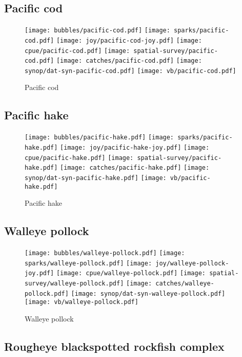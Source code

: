 \subsection*{Pacific cod}

\begin{figure}[htbp]
\centering
\texttt{[image: bubbles/pacific-cod.pdf]}
\texttt{[image: sparks/pacific-cod.pdf]}
\texttt{[image: joy/pacific-cod-joy.pdf]}
\texttt{[image: cpue/pacific-cod.pdf]}
\texttt{[image: spatial-survey/pacific-cod.pdf]}
\texttt{[image: catches/pacific-cod.pdf]}
\texttt{[image: synop/dat-syn-pacific-cod.pdf]}
\texttt{[image: vb/pacific-cod.pdf]}
\caption{Pacific cod}
\end{figure}
\clearpage
\subsection*{Pacific hake}

\begin{figure}[htbp]
\centering
\texttt{[image: bubbles/pacific-hake.pdf]}
\texttt{[image: sparks/pacific-hake.pdf]}
\texttt{[image: joy/pacific-hake-joy.pdf]}
\texttt{[image: cpue/pacific-hake.pdf]}
\texttt{[image: spatial-survey/pacific-hake.pdf]}
\texttt{[image: catches/pacific-hake.pdf]}
\texttt{[image: synop/dat-syn-pacific-hake.pdf]}
\texttt{[image: vb/pacific-hake.pdf]}
\caption{Pacific hake}
\end{figure}
\clearpage
\subsection*{Walleye pollock}

\begin{figure}[htbp]
\centering
\texttt{[image: bubbles/walleye-pollock.pdf]}
\texttt{[image: sparks/walleye-pollock.pdf]}
\texttt{[image: joy/walleye-pollock-joy.pdf]}
\texttt{[image: cpue/walleye-pollock.pdf]}
\texttt{[image: spatial-survey/walleye-pollock.pdf]}
\texttt{[image: catches/walleye-pollock.pdf]}
\texttt{[image: synop/dat-syn-walleye-pollock.pdf]}
\texttt{[image: vb/walleye-pollock.pdf]}
\caption{Walleye pollock}
\end{figure}
\clearpage
\subsection*{Rougheye blackspotted rockfish complex}

